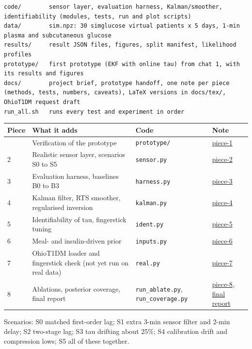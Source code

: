 \documentclass[11pt,a4paper]{article}
\begin{document}
\begin{verbatim}
code/        sensor layer, evaluation harness, Kalman/smoother, identifiability (modules, tests, run and plot scripts)
data/        sim.npz: 30 simglucose virtual patients x 5 days, 1-min plasma and subcutaneous glucose
results/     result JSON files, figures, split manifest, likelihood profiles
prototype/   first prototype (EKF with online tau) from chat 1, with its results and figures
docs/        project brief, prototype handoff, one note per piece (methods, tests, numbers, caveats), LaTeX versions in docs/tex/, OhioT1DM request draft
run_all.sh   runs every test and experiment in order
\end{verbatim}

\begin{longtable}[]{@{}llll@{}}
\toprule\noalign{}
Piece & What it adds & Code & Note \\
\midrule\noalign{}
\endhead
\bottomrule\noalign{}
\endlastfoot
1 & Verification of the prototype & \texttt{prototype/} &
\href{docs/piece-1-prototype-verification.md}{piece-1} \\
2 & Realistic sensor layer, scenarios S0 to S5 & \texttt{sensor.py} &
\href{docs/piece-2-sensor-layer.md}{piece-2} \\
3 & Evaluation harness, baselines B0 to B3 & \texttt{harness.py} &
\href{docs/piece-3-evaluation-harness.md}{piece-3} \\
4 & Kalman filter, RTS smoother, regularised inversion &
\texttt{kalman.py} &
\href{docs/piece-4-kalman-estimators.md}{piece-4} \\
5 & Identifiability of tau, fingerstick tuning & \texttt{ident.py} &
\href{docs/piece-5-identifiability.md}{piece-5} \\
6 & Meal- and insulin-driven prior & \texttt{inputs.py} &
\href{docs/piece-6-input-prior.md}{piece-6} \\
7 & OhioT1DM loader and fingerstick check (not yet run on real data) &
\texttt{real.py} & \href{docs/piece-7-real-data.md}{piece-7} \\
8 & Ablations, posterior coverage, final report &
\texttt{run\_ablate.py}, \texttt{run\_coverage.py} &
\href{docs/piece-8-ablations.md}{piece-8},
\href{docs/tex/final-report.tex}{final report} \\
\end{longtable}

Scenarios: S0 matched first-order lag; S1 extra 3-min sensor filter and
2-min delay; S2 two-stage lag; S3 tau drifting about 25\%; S4
calibration drift and compression lows; S5 all of these together.
\end{document}

